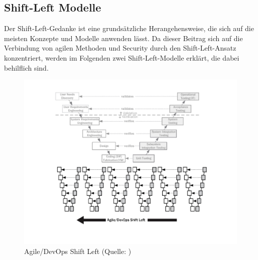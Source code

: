 \subsection{Shift-Left Modelle}
\label{sec:arten}
Der Shift-Left-Gedanke ist eine grundsätzliche Herangehensweise, die sich auf die meisten Konzepte und Modelle anwenden lässt. Da dieser Beitrag sich auf die Verbindung von agilen Methoden und Security durch den Shift-Left-Ansatz konzentriert, werden im Folgenden zwei Shift-Left-Modelle erklärt, die dabei behilflich sind.

\begin{figure}
    \centering
    \includegraphics[width=0.9\linewidth]{images/Agile_DevOps_Shift_Left.png}
    \caption{Agile/DevOps Shift Left (Quelle: )}
    \label{fig:agiledevops}
\end{figure}

